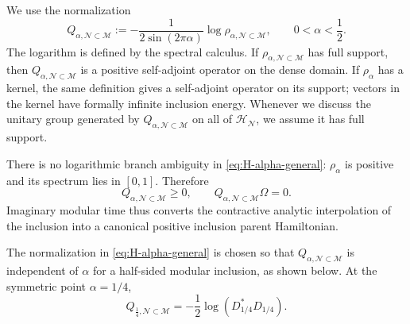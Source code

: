 \documentclass[a4paper,11pt]{article}
\theoremstyle{definition}
\newcommand{\mN}{\mathcal{N}}
\newcommand{\mH}{\mathcal{H}}
\newcommand{\mM}{\mathcal{M}}
\begin{document}
We use the normalization
\begin{equation}
    \boxed{
    Q_{\alpha,\mN\subset\mM}
    :=
    -\frac{1}{2\sin(2\pi\alpha)}
    \log
    \rho_{\alpha,\mN\subset\mM},
    \qquad
    0<\alpha<\frac12 .
    }
    \label{eq:H-alpha-general}
\end{equation}
The logarithm is defined by the spectral calculus. If
$\rho_{\alpha,\mN\subset\mM}$ has full support, then
$Q_{\alpha,\mN\subset\mM}$ is a positive self-adjoint operator on the dense
domain. If $\rho_\alpha$ has a kernel, the same definition gives a self-adjoint
operator on its support; vectors in the kernel have formally infinite
inclusion energy. Whenever we discuss the unitary group generated by
$Q_{\alpha,\mN\subset\mM}$ on all of $\mH_{\mN}$, we assume it has full support. 

There is no logarithmic branch ambiguity in
\eqref{eq:H-alpha-general}: $\rho_\alpha$ is positive and its spectrum lies
in $[0,1]$. Therefore
\begin{equation}
    \boxed{
    Q_{\alpha,\mN\subset\mM}\geq0,
    \qquad
    Q_{\alpha,\mN\subset\mM}\Omega=0.
    }
    \label{eq:H-alpha-positive}
\end{equation}
Imaginary modular time thus converts the contractive analytic interpolation
of the inclusion into a canonical positive inclusion parent Hamiltonian.

The normalization in \eqref{eq:H-alpha-general} is chosen so that
$Q_{\alpha,\mN\subset\mM}$ is independent of $\alpha$ for a half-sided
modular inclusion, as shown below. At the symmetric point $\alpha=1/4$,
\begin{equation}
    Q_{\frac14,\mN\subset\mM}
    =
    -\frac12
    \log\left(D_{1/4}^*D_{1/4}\right).
    \label{eq:H-quarter}
\end{equation}
\end{document}
